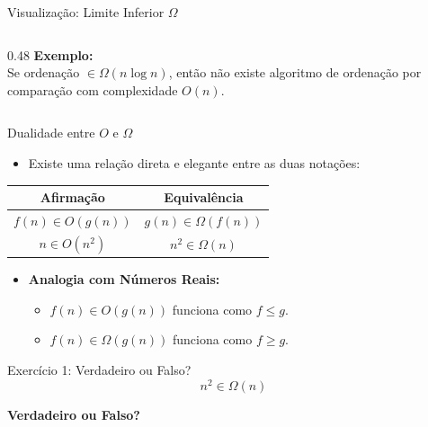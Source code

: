 \documentclass[aspectratio=169]{beamer}
\begin{document}
\begin{frame}{Visualização: Limite Inferior $\Omega$}
\begin{columns}[c]
\begin{column}{0.48\textwidth}
            \vspace{0.3cm}
            \textbf{Exemplo:}\\[3pt]
            \small Se ordenação $\in \Omega(n \log n)$,
            então \alert{não existe} algoritmo de ordenação
            por comparação com complexidade $O(n)$.
        \end{column}
    \end{columns}
\end{frame}
\begin{frame}{Dualidade entre $O$ e $\Omega$}
    \begin{itemize}
        \item Existe uma relação direta e elegante entre as duas notações:
    \end{itemize}

    \begin{center}
        \renewcommand{\arraystretch}{1.5}
        \begin{tabular}{|c|c|}
            \hline
            \textbf{Afirmação} & \textbf{Equivalência} \\ \hline
            $f(n) \in O(g(n))$ & $g(n) \in \Omega(f(n))$ \\ \hline
            $n \in O(n^2)$ & $n^2 \in \Omega(n)$ \\ \hline
        \end{tabular}
    \end{center}

    \begin{itemize}
        \item \textbf{Analogia com Números Reais:}
        \begin{itemize}
            \item $f(n) \in O(g(n))$ funciona como $f \le g$.
            \item $f(n) \in \Omega(g(n))$ funciona como $f \ge g$.
        \end{itemize}
    \end{itemize}
\end{frame}


\begin{frame}{Exercício 1: Verdadeiro ou Falso?}
    \Large
    \[ n^2 \in \Omega(n) \]
    \begin{center}
        \textbf{Verdadeiro ou Falso?}
    \end{center}
\end{frame}
\end{document}
